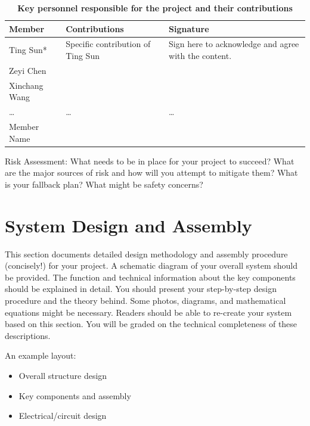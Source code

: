 \documentclass{engr1000j-s2}
\begin{document}
  \begin{table}[!ht]
  \centering
  \caption{\quad \textbf{Key personnel responsible for the project and their contributions}}
  \begin{tabular}{
    p{} 
    >{\centering\arraybackslash}p{} 
    >{\centering\arraybackslash}p{}
  }
    \toprule 
    Member & Contributions & Signature \\
    \midrule 
    Ting Sun* & Specific contribution of Ting Sun & Sign here to acknowledge and agree with the content. \\
    Zeyi Chen &  &  \\
    Xinchang Wang &  &  \\
    \dots & \dots & \dots \\
    Member Name &  &  \\
    \bottomrule
  \end{tabular}
  \label{tab:personnel}
\end{table}


  Risk Assessment: What needs to be in place for your project to succeed? What
  are the major sources of risk and how will you attempt to mitigate them? What is
  your fallback plan? What might be safety concerns?

  \hspace{1em}
  
  \section{System Design and Assembly}
  This section documents detailed design methodology and assembly procedure (concisely!) for your project. A schematic diagram of your overall system should be provided. The function and technical information about the key components should be explained in detail. You should present your step-by-step design procedure and the theory behind. Some photos, diagrams, and mathematical equations might be necessary. Readers should be able to re-create your system based on this section. You will be graded on the technical completeness of these descriptions.  
  
  An example layout:

  \begin{itemize}
    \item Overall structure design
    \newline
    \item Key components and assembly
    \newline
    \item Electrical/circuit design
  \end{itemize}
  \hspace{1em}
\end{document}
